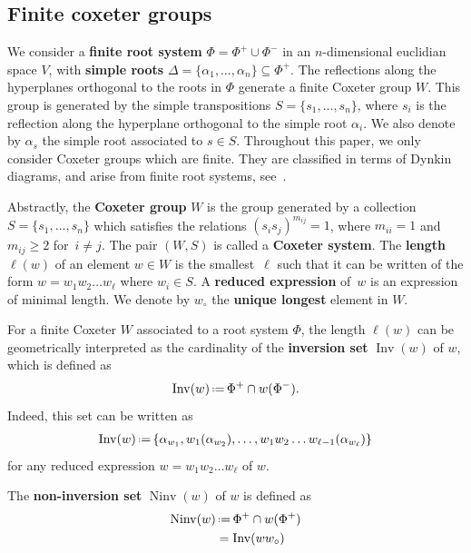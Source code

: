 \documentclass{amsart}
\theoremstyle{definition}
\newcommand{\eqdef}{\mbox{\,\raisebox{0.2ex}{\scriptsize\ensuremath{\mathrm:}}\ensuremath{=}\,}} %
\DeclareMathOperator{\Inv}{Inv} %
\DeclareMathOperator{\Ninv}{Ninv} %
\newcommand{\defn}[1]{\textbf{\textsf{\color{PineGreen} #1}}} %
\newcommand{\cesar}[1]{\todo[color=orange!30,inline]{#1 \\ \hfill --- C.}}
\newcommand{\wo}{w_\circ} %
\begin{document}
\subsection{Finite coxeter groups} 
We consider a \defn{finite root system} $\Phi=\Phi^+\cup \Phi^-$ in an $n$-dimensional euclidian space $V$, with \defn{simple roots} $\Delta=\{\alpha_1,\dots,\alpha_n\} \subseteq \Phi^+$.
The reflections along the hyperplanes orthogonal to the roots in $\Phi$ generate a finite Coxeter group $W$. 
This group is generated by the simple transpositions $S=\{s_1,\dots ,s_n\}$, where $s_i$ is the reflection along the hyperplane orthogonal to the simple root $\alpha_i$.
We also denote by $\alpha_s$ the simple root associated to $s\in S$.
Throughout this paper, we only consider Coxeter groups which are finite.
They are classified in terms of Dynkin diagrams, and arise from finite root systems, see~\cite{Humphreys}. 

Abstractly, the \defn{Coxeter group} $W$ is the group generated by a collection $S=\{s_1,\dots, s_n\}$ which satisfies the relations $(s_is_j)^{m_{ij}}=1$, where $m_{ii}=1$ and $m_{ij}\geq 2$ for~$i\neq j$.
The pair $(W,S)$ is called a \defn{Coxeter system}.
The \defn{length} $\ell(w)$ of an element $w\in W$ is the smallest~$\ell$ such that it can be written of the form $w=w_1w_2\dots w_\ell$ where $w_i\in S$.
A \defn{reduced expression} of~$w$ is an expression of minimal length.
We denote by $\wo$ the \defn{unique longest} element in $W$.

For a finite Coxeter $W$ associated to a root system $\Phi$, the length $\ell(w)$ can be geometrically interpreted as the cardinality of the \defn{inversion set} $\Inv(w)$ of $w$, which is defined as
\begin{align}\label{def_inversionset}
\Inv(w) \eqdef \Phi^+ \cap w(\Phi^-).
\end{align}
Indeed, this set can be written as 
\begin{align}\label{def_inversionset2}
\Inv(w) \eqdef \{\alpha_{w_1}, w_1(\alpha_{w_2}),\dots , w_1w_2\dots w_{\ell-1}(\alpha_{w_\ell})\}
\end{align}
for any reduced expression $w=w_1w_2\dots w_\ell$ of $w$.

The \defn{non-inversion set} $\Ninv (w)$ of $w$ is defined as
\begin{align}
\Ninv(w) & \eqdef \Phi^+ \cap w(\Phi^+) \label{def_noninversionset} \\
& =\Inv(w\wo)
\end{align}
\end{document}

